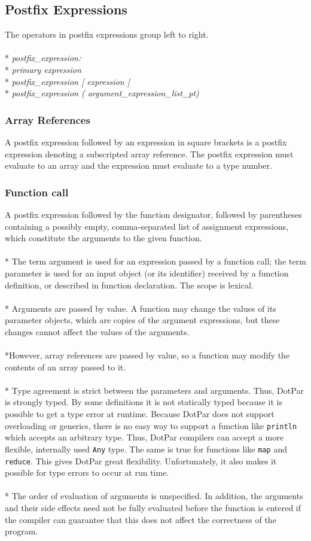 \subsection{Postfix Expressions}
The operators in postfix expressions group left to right.
\\ \\* \tab \emph{postfix\_expression:}
\\* \tab \tab \emph{primary expression}
\\* \tab \tab \emph{postfix\_expression [ expression ]}
\\* \tab \tab \emph{postfix\_expression ( argument\_expression\_list\_pt)}
\subsubsection{Array References}
A postfix expression followed by an expression in square brackets is a postfix expression denoting a subscripted array reference. The postfix expression must evaluate to an array and the expression must evaluate to a type number.
\subsubsection{Function call}
A postfix expression followed by the function designator, followed by
parentheses containing a possibly empty, comma-separated list of assignment
expressions, which constitute the arguments to the given function.   
\\ \\* The term argument is used for an expression passed by a function call;
the term parameter is used for an input object (or its identifier) received by a
function definition, or described in function declaration. The scope is lexical.
\\ \\* Arguments are passed by value. A function may change the values of its
parameter objects, which are copies of the argument expressions, but these
changes cannot affect the values of the arguments. 
\\ \\*However, array references are passed by value, so a function may modify
the contents of an array passed to it.
\\ \\* Type agreement is strict between the parameters and arguments. Thus,
DotPar is strongly typed. By some definitions it is not statically typed because
it is possible to get a type error at runtime. Because DotPar does not support
overloading or generics, there is no easy way to support a function like
\verb=println= which accepts an arbitrary type. Thus, DotPar compilers can
accept a more flexible, internally used \verb=Any= type. The same is true for
functions like \verb=map= and \verb=reduce=. This gives DotPar great
flexibility. Unfortunately, it also makes it possible for type errors to occur
at run time.
\\ \\* The order of evaluation of arguments is unspecified. In addition, the
arguments and their side effects need not be fully evaluated before the function
is entered if the compiler can guarantee that this does not affect the
correctness of the program. 

